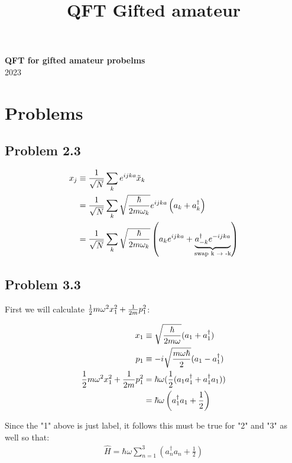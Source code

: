 \documentclass[11pt]{article}
\theoremstyle{definition}
\begin{document}
\setcounter{section}{8}
\title{QFT Gifted amateur}

\thispagestyle{empty}

\begin{center}
{\LARGE \bf QFT for gifted amateur probelms}\\
2023
\end{center}


\section{Problems}
\subsection{Problem 2.3}

\begin{align}
x_j & \equiv {1 \over \sqrt{N}} \sum_k e^{i j k a} \tilde{x}_k \\
&= {1 \over \sqrt{N}} \sum_k  \sqrt{\hbar \over 2 m \omega_k} e^{i j k a} \left(a_k + a^{\dagger}_k \right) \\
&= {1 \over \sqrt{N}} \sum_k \sqrt{\hbar \over 2 m \omega_k} \left( a_k e^{ijka} + \underbrace{a^{\dagger}_{-k} e^{-ijka}}_{\text{swap k $\rightarrow$ -k}} \right)
\end{align}

\subsection{Problem 3.3}

First we will calculate $\frac12 m \omega^2 x_1^2 + {1 \over 2 m} p_1^2$:

\begin{align}
x_1 &\equiv \sqrt{\hbar \over 2 m \omega} (a_1 + a_1^\dagger) \\
p_1 &\equiv -i \sqrt{m \omega \hbar \over 2} (a_1 - a_1^\dagger) \\
\frac12 m \omega^2 x_1^2 + {1 \over 2 m} p_1^2 &=  \hbar \omega (\frac12 (a_1 a_1^\dagger + a_1^\dagger a_1)) \\
& = \hbar \omega \left(a_1^\dagger a_1 + \frac12 \right)
\end{align}

Since the "1" above is just label, it follows this must be true for "2" and "3" as well so that:
\begin{align}
\hat{H} = \hbar \omega \sum_{n=1}^3 \left(a_n^\dagger a_n + \frac12 \right)
\end{align}
\end{document}
